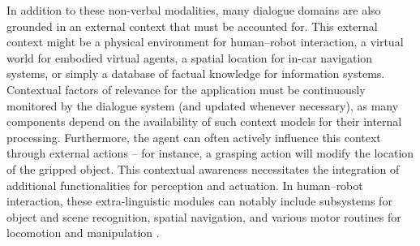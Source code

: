 In addition to these non-verbal modalities, many dialogue domains are also grounded in an external context that must be accounted for.  This external context might be a physical environment for human--robot interaction, a virtual world for embodied virtual agents, a spatial location for in-car navigation systems, or simply a database of factual knowledge for information systems. Contextual factors of relevance for the application must be continuously monitored by the dialogue system (and updated whenever necessary), as many components depend on the availability of such context models for their internal processing.  Furthermore, the agent can often actively influence this context through external actions -- for instance, a grasping action will modify the location of the gripped object.   This contextual awareness necessitates the integration of additional functionalities for perception and actuation. In human--robot interaction, these extra-linguistic modules can notably include subsystems for object and scene recognition, spatial navigation, and various motor routines for locomotion and manipulation \citep[see][for a survey]{goodrich2007human}. 

